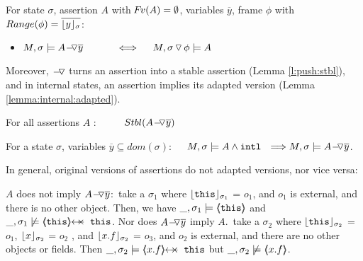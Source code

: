 \begin{lemma} 
\label{lemma:push:ass:state}
For   state  $\sigma$, assertion $A$ with $\fv(A)=\emptyset$,  variables   $\overline y$, frame $\phi$ with $Range (\phi)=\overline {\interpret \sigma y}$:


\begin{itemize} %
 \item
 \label{lemma:push:ass:state:one}
 \label{lemma:push:ass:state:two}
$M, \sigma \models \PushAS  {y} {A}\ \  \ \ \ \ \  \ \ \    \Longleftrightarrow  \ \ \ \ M,  \PushSLong {\phi} {\sigma}   \models A$
\end{itemize}  %
\end{lemma}


Moreover, $\FIXSymbolA$ turns an assertion into a stable assertion (Lemma \ref{l:push:stbl}), and {in internal states, an assertion implies its adapted version (Lemma \ref{lemma:internal:adapted}).}

\begin{lemma}
For all    assertions $A$ : \ \ \ \ \  $\Stable{ \PushAS y A}$
\label{l:push:stbl}
\end{lemma}

{
\begin{lemma}
\label{lemma:internal:adapted}
For a state $\sigma$, variables $\overline y\subseteq dom(\sigma)$:\ \ \ $M, \sigma \models A \wedge \intThis \ \ \Longrightarrow M, \sigma \models  \PushAS {y} {A}$.
\end{lemma}
}

{ In general, original versions of  assertions do  not   adapted versions, nor vice versa:}
 

\begin{example}
\label{push:does:not:imply}
\notesep   $A$ does not imply $\PushAS {y} {A}$:\  \Eg  take 
  a   $\sigma_1$ where $\interpret {\sigma_1} {\prg{this}}$ = $o_1$, and $o_1$ is {external},  and there is no other object. Then, we have
$\_,\sigma_1 \models \inside {\prg{this}}$ and $\_,\sigma_1 \not\models \protectedFrom {\prg{this}} {\prg{this}}$.
\notesep Nor does  $\PushAS {y} {A}$  imply $A$.\  \Eg  take a $\sigma_2$ where $\interpret {\sigma_2} {\prg{this}}$ = $o_1$,
 $\interpret {\sigma_2} {x}$ = $o_2$ , and  $\interpret {\sigma_2} {x.f}$ = $o_3$, and $o_2$ is external, and there are no other objects or fields.
 Then $\_,\sigma_2 \models   \protectedFrom {x.f} {\prg{this}}$ but  $\_,\sigma_2 \not\models \inside {x.f}$.
\end{example}






